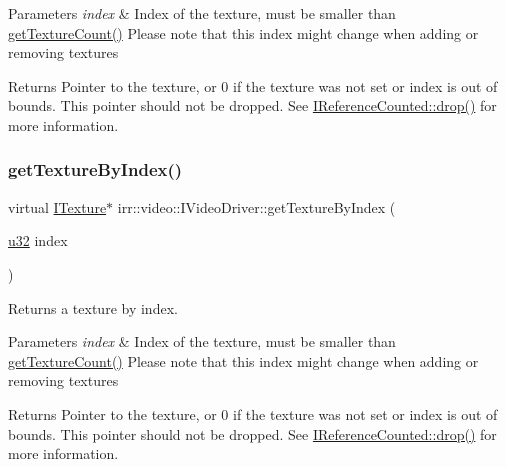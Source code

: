 \begin{DoxyParams}{Parameters}
{\em index} & Index of the texture, must be smaller than \hyperlink{classirr_1_1video_1_1IVideoDriver_a4c3f976980dd8387db37feca8c8e2d73}{get\+Texture\+Count()} Please note that this index might change when adding or removing textures \\
\hline
\end{DoxyParams}
\begin{DoxyReturn}{Returns}
Pointer to the texture, or 0 if the texture was not set or index is out of bounds. This pointer should not be dropped. See \hyperlink{classirr_1_1IReferenceCounted_a03856a09355b89d178090c4a5f738543}{I\+Reference\+Counted\+::drop()} for more information. 
\end{DoxyReturn}
\mbox{\label{classirr_1_1video_1_1IVideoDriver_abfe395b1320ac52cea6be0e912135351}} 
\subsubsection{\texorpdfstring{get\+Texture\+By\+Index()}{getTextureByIndex()}\hspace{0.1cm}{\footnotesize\ttfamily [2/2]}}
{\footnotesize\ttfamily virtual \hyperlink{classirr_1_1video_1_1ITexture}{I\+Texture}$\ast$ irr\+::video\+::\+I\+Video\+Driver\+::get\+Texture\+By\+Index (\begin{DoxyParamCaption}\item[{\hyperlink{namespaceirr_a0416a53257075833e7002efd0a18e804}{u32}}]{index }\end{DoxyParamCaption})\hspace{0.3cm}{\ttfamily [pure virtual]}}



Returns a texture by index. 


\begin{DoxyParams}{Parameters}
{\em index} & Index of the texture, must be smaller than \hyperlink{classirr_1_1video_1_1IVideoDriver_a4c3f976980dd8387db37feca8c8e2d73}{get\+Texture\+Count()} Please note that this index might change when adding or removing textures \\
\hline
\end{DoxyParams}
\begin{DoxyReturn}{Returns}
Pointer to the texture, or 0 if the texture was not set or index is out of bounds. This pointer should not be dropped. See \hyperlink{classirr_1_1IReferenceCounted_a03856a09355b89d178090c4a5f738543}{I\+Reference\+Counted\+::drop()} for more information. 
\end{DoxyReturn}
\mbox{\label{classirr_1_1video_1_1IVideoDriver_a4c3f976980dd8387db37feca8c8e2d73}} 
